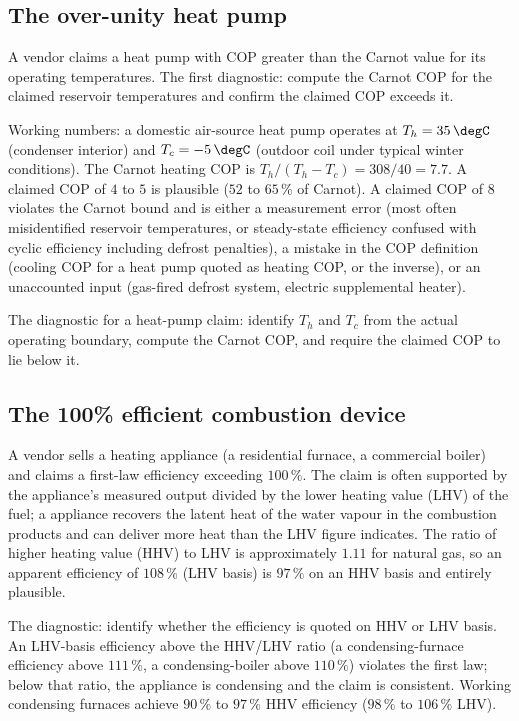 \subsection{The over-unity heat pump}

A vendor claims a heat pump with COP greater than the Carnot value
for its operating temperatures. The first diagnostic: compute the
Carnot COP for the claimed reservoir temperatures and confirm the
claimed COP exceeds it.

Working numbers: a domestic air-source heat pump operates at $T_h =
35\,\degC$ (condenser interior) and $T_c = -5\,\degC$ (outdoor coil
under typical winter conditions). The Carnot heating COP is $T_h/
(T_h - T_c) = 308/40 = 7.7$. A claimed COP of $4$ to $5$ is plausible
($52$ to $65\,\%$ of Carnot). A claimed COP of $8$ violates the
Carnot bound and is either a measurement error (most often
misidentified reservoir temperatures, or steady-state efficiency
confused with cyclic efficiency including defrost penalties), a
mistake in the COP definition (cooling COP for a heat pump quoted as
heating COP, or the inverse), or an unaccounted input (gas-fired
defrost system, electric supplemental heater).

The diagnostic for a heat-pump claim: identify $T_h$ and $T_c$ from
the actual operating boundary, compute the Carnot COP, and require
the claimed COP to lie below it.

\subsection{The 100\% efficient combustion device}

A vendor sells a heating appliance (a residential furnace, a
commercial boiler) and claims a first-law efficiency exceeding
$100\,\%$. The claim is often supported by the appliance's measured
output divided by the lower heating value (LHV) of the fuel; a
 appliance recovers the latent heat of the water
vapour in the combustion products and can deliver more heat than the
LHV figure indicates. The ratio of higher heating value (HHV) to LHV
is approximately $1.11$ for natural gas, so an apparent efficiency of
$108\,\%$ (LHV basis) is $97\,\%$ on an HHV basis and entirely
plausible.

The diagnostic: identify whether the efficiency is quoted on HHV or
LHV basis. An LHV-basis efficiency above the HHV/LHV ratio (a
condensing-furnace efficiency above $111\,\%$, a condensing-boiler
above $110\,\%$) violates the first law; below that ratio, the
appliance is condensing and the claim is consistent. Working
condensing furnaces achieve $90\,\%$ to $97\,\%$ HHV efficiency
($98\,\%$ to $106\,\%$ LHV).

